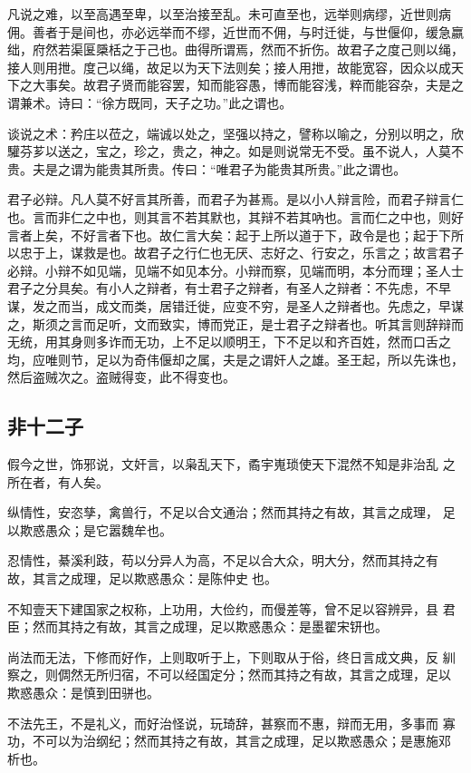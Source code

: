 \documentclass[]{article}
\begin{document}
凡说之难，以至高遇至卑，以至治接至乱。未可直至也，远举则病缪，近世则病佣。善者于是间也，亦必远举而不缪，近世而不佣，与时迁徙，与世偃仰，缓急嬴绌，府然若渠匽檃栝之于己也。曲得所谓焉，然而不折伤。故君子之度己则以绳，接人则用抴。度己以绳，故足以为天下法则矣；接人用抴，故能宽容，因众以成天下之大事矣。故君子贤而能容罢，知而能容愚，博而能容浅，粹而能容杂，夫是之谓兼术。诗曰：``徐方既同，天子之功。''此之谓也。

谈说之术：矜庄以莅之，端诚以处之，坚强以持之，譬称以喻之，分别以明之，欣驩芬芗以送之，宝之，珍之，贵之，神之。如是则说常无不受。虽不说人，人莫不贵。夫是之谓为能贵其所贵。传曰：``唯君子为能贵其所贵。''此之谓也。

君子必辩。凡人莫不好言其所善，而君子为甚焉。是以小人辩言险，而君子辩言仁也。言而非仁之中也，则其言不若其默也，其辩不若其吶也。言而仁之中也，则好言者上矣，不好言者下也。故仁言大矣：起于上所以道于下，政令是也；起于下所以忠于上，谋救是也。故君子之行仁也无厌、志好之、行安之，乐言之；故言君子必辩。小辩不如见端，见端不如见本分。小辩而察，见端而明，本分而理；圣人士君子之分具矣。有小人之辩者，有士君子之辩者，有圣人之辩者：不先虑，不早谋，发之而当，成文而类，居错迁徙，应变不穷，是圣人之辩者也。先虑之，早谋之，斯须之言而足听，文而致实，博而党正，是士君子之辩者也。听其言则辞辩而无统，用其身则多诈而无功，上不足以顺明王，下不足以和齐百姓，然而口舌之均，应唯则节，足以为奇伟偃却之属，夫是之谓奸人之雄。圣王起，所以先诛也，然后盗贼次之。盗贼得变，此不得变也。

\hypertarget{header-n32}{%
\subsection{非十二子}\label{header-n32}}

假今之世，饰邪说，文奸言，以枭乱天下，矞宇嵬琐使天下混然不知是非治乱
之所在者，有人矣。

纵情性，安恣孳，禽兽行，不足以合文通治；然而其持之有故，其言之成理，
足以欺惑愚众；是它嚣魏牟也。

忍情性，綦溪利跂，苟以分异人为高，不足以合大众，明大分，然而其持之有
故，其言之成理，足以欺惑愚众：是陈仲史也。

不知壹天下建国家之权称，上功用，大俭约，而僈差等，曾不足以容辨异，县
君臣；然而其持之有故，其言之成理，足以欺惑愚众：是墨翟宋钘也。

尚法而无法，下修而好作，上则取听于上，下则取从于俗，终日言成文典，反
紃察之，则倜然无所归宿，不可以经国定分；然而其持之有故，其言之成理，足以
欺惑愚众：是慎到田骈也。

不法先王，不是礼义，而好治怪说，玩琦辞，甚察而不惠，辩而无用，多事而
寡功，不可以为治纲纪；然而其持之有故，其言之成理，足以欺惑愚众；是惠施邓
析也。
\end{document}
